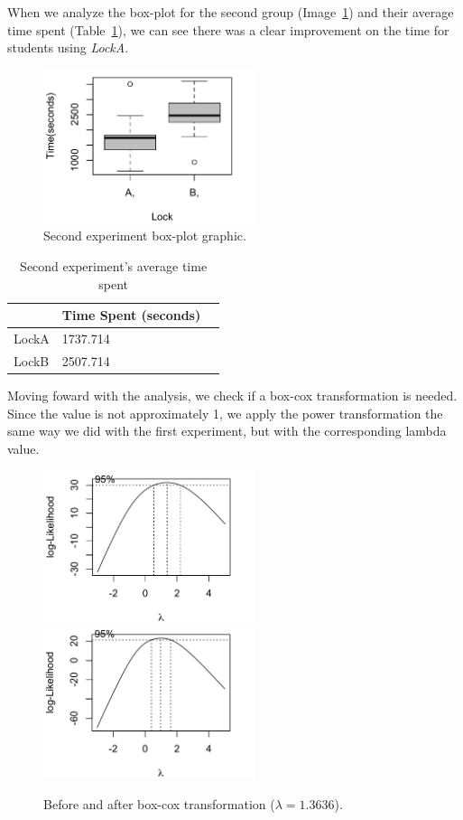 When we analyze the box-plot for the second group (Image~\ref{fig:boxplot2}) and their average time spent (Table~\ref{tab:mean2}), we can see there was a clear improvement on the time for students using \emph{LockA}.

\begin{figure}
\centering
\includegraphics[height=4.5cm]{img/g1.png}
\caption{Second experiment box-plot graphic.}\label{fig:boxplot2}
\end{figure}

\begin{table}
\centering
\begin{tabular}{|l|l|l|}
\hline
 & Time Spent (seconds)\\
\hline
LockA & 1737.714 \\
LockB & 2507.714 \\
\hline
\end{tabular}
\caption{Second experiment's average time spent}\label{tab:mean2}
\end{table}

Moving foward with the analysis, we check if a box-cox transformation is needed. Since the value is not approximately 1, we apply the power transformation the same way we did with the first experiment, but with the corresponding lambda value.

\begin{figure}
\includegraphics[height=4.5cm]{img/g2.png}
\hfill
\includegraphics[height=4.4cm]{img/g2boxcox.png}
\caption{Before and after box-cox transformation ($\lambda = 1.3636$).}\label{fig:transf2}
\end{figure}

